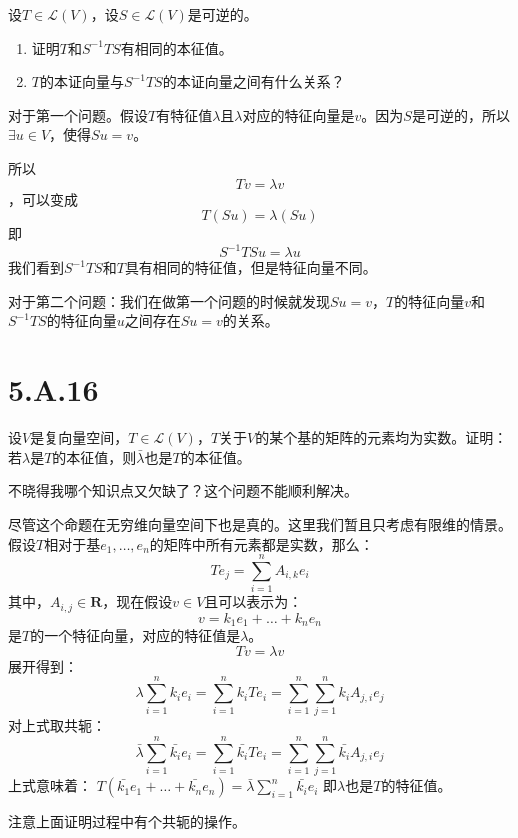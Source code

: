 \documentclass[10pt,a4paper,UTF8]{article}
\begin{document}
\begin{problem}
设\(T\in \mathcal{L}(V)\)，设\(S\in \mathcal{L}(V)\)是可逆的。

\begin{enumerate}
\item 证明\(T\)和\(S^{-1}TS\)有相同的本征值。
\item \(T\)的本证向量与\(S^{-1}TS\)的本证向量之间有什么关系？
\end{enumerate}
\end{problem}

\begin{answer}
对于第一个问题。假设\(T\)有特征值\(\lambda\)且\(\lambda\)对应的特征向量是\(v\)。因为\(S\)是可逆的，所以\(\exists u\in V\)，使得\(Su= v\)。

所以\[Tv = \lambda v\]，可以变成\[T(Su) = \lambda (Su)\] 即\[S^{-1}TS u = \lambda u\] 我们看到\(S^{-1}TS\)和\(T\)具有相同的特征值，但是特征向量不同。

对于第二个问题：我们在做第一个问题的时候就发现\(Su=v\)，\(T\)的特征向量\(v\)和\(S^{-1}TS\)的特征向量\(u\)之间存在\(Su = v\)的关系。
\end{answer}
\section{5.A.16}
\label{sec:orgfe0bf76}


\begin{problem}
设\(V\)是复向量空间，\(T\in \mathcal{L}(V)\)，\(T\)关于\(V\)的某个基的矩阵的元素均为实数。证明：若\(\lambda\)是\(T\)的本征值，则\(\bar{\lambda}\)也是\(T\)的本征值。
\end{problem}

\begin{answer}
不晓得我哪个知识点又欠缺了？这个问题不能顺利解决。

尽管这个命题在无穷维向量空间下也是真的。这里我们暂且只考虑有限维的情景。假设\(T\)相对于基\(e_{1},\ldots ,e_{n}\)的矩阵中所有元素都是实数，那么：
\[Te_{j} = \sum_{i=1}^{n}A_{i,k}e_{i}\]其中，\(A_{i,j}\in \mathbf{R}\)，现在假设\(v\in V\)且可以表示为：
\[v = k_{1}e_{1} + \ldots + k_{n}e_{n}\]
是\(T\)的一个特征向量，对应的特征值是\(\lambda\)。
\[Tv = \lambda v\]
展开得到：
\[\lambda \sum_{i=1}^{n}k_{i}e_{i} = \sum_{i=1}^{n}k_{i}Te_{i} = \sum_{i=1}^{n}\sum_{j=1}^{n}k_{i}A_{j,i}e_{j}\]
对上式取共轭：
\[ \bar{\lambda} \sum_{i=1}^{n} \bar{k_{i}}e_{i} = \sum_{i=1}^{n}\bar{k_{i}}Te_{i} = \sum_{i=1}^{n}\sum_{j=1}^{n}\bar{k_{i}}A_{j,i}e_{j}\]
上式意味着：
\(T(\bar{k_{1}}e_{1} + \ldots + \bar{k_{n}}e_{n}) = \bar{\lambda}\sum_{i=1}^{n}\bar{k_{i}}e_{i}\)
即\(\lambda\)也是\(T\)的特征值。

注意上面证明过程中有个共轭的操作。
\end{answer}
\end{document}
